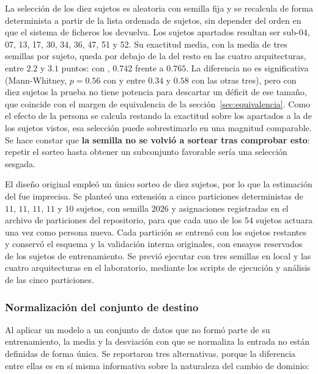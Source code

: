 La selección de los diez sujetos es aleatoria con semilla fija y se recalcula de forma
determinista a partir de la lista ordenada de sujetos, sin depender del orden en que el
sistema de ficheros los devuelva. Los sujetos apartados resultan ser
sub-04, 07, 13, 17, 30, 34, 36, 47, 51 y 52. Su exactitud \loso{} media, con la media de tres semillas por sujeto, queda por debajo
de la del resto en las cuatro arquitecturas, entre $2.2$ y $3.1$ puntos: con \eegnet{},
$0.742$ frente a $0.765$. La diferencia no es significativa (Mann-Whitney, $p = 0.56$ con
\eegnet{} y entre $0.34$ y $0.58$ con las otras tres), pero con diez sujetos la prueba no
tiene potencia para descartar un déficit de ese tamaño, que coincide con el margen de
equivalencia de la sección~\ref{sec:equivalencia}. Como el efecto de la persona se calcula
restando la exactitud sobre los apartados a la de los sujetos vistos, esa selección puede
sobrestimarlo en una magnitud comparable. Se hace
constar que \textbf{la semilla no se volvió a sortear tras comprobar esto}: repetir el
sorteo hasta obtener un subconjunto favorable sería una selección sesgada.

El diseño original empleó un único sorteo de diez sujetos, por lo que la estimación del \idp{} fue imprecisa. Se planteó una extensión a cinco particiones deterministas de $11$, $11$, $11$, $11$ y $10$ sujetos, con semilla $2026$ y asignaciones registradas en el archivo de particiones del repositorio, para que cada uno de los $54$ sujetos actuara una vez como persona nueva. Cada partición se entrenó con los sujetos restantes y conservó el esquema y la validación interna originales, con ensayos reservados de los sujetos de entrenamiento. Se previó ejecutar \eegnet{} con tres semillas en local y las cuatro arquitecturas en el laboratorio, mediante los scripts de ejecución y análisis de las cinco particiones.

\subsubsection{Normalización del conjunto de destino}

Al aplicar un modelo a un conjunto de datos que no formó parte de su entrenamiento, la media y la desviación con que se
normaliza la entrada no están definidas de forma única. Se reportaron tres alternativas, porque la
diferencia entre ellas es en sí misma informativa sobre la naturaleza del cambio de dominio:

